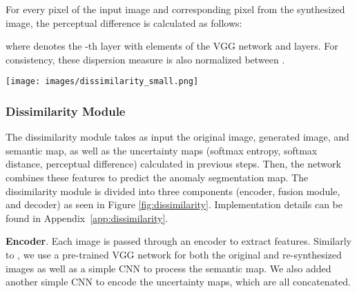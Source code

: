 \documentclass[final]{cvpr}
\begin{document}
For every pixel  of the input image and corresponding pixel  from the synthesized image, the perceptual difference is calculated as follows:



where  denotes the -th layer with  elements of the VGG network and  layers. For consistency, these dispersion measure is also normalized between . 

\begin{figure*}[!th]
\begin{center}
   \texttt{[image: images/dissimilarity\_small.png]}
   \vspace{-9mm}
\end{center}
   \caption{\textbf{Dissimilarity Module Architecture}. Given the input, synthesized, semantic, and uncertainty images, we extract high to low-level features for each image with a CNN. For each level, we then concatenate the input (blue), synthesized (yellow), and semantic (red) features and fuse them with a 1x1 convolution. The resulting map is used to calculate a correlation with the features from the uncertainty maps (green). The output of the fusion module (purple) is then fed to a decoder to produce the predicted anomaly segmentation. Note the semantic map is used in the decoder block to ensure a spatial aware prediction by using a SPADE normalization \cite{SPADE}.}
\label{fig:dissimilarity}
\vspace{-5mm}
\end{figure*}

\subsubsection{Dissimilarity Module}
The dissimilarity module takes as input the original image, generated image, and semantic map, as well as the uncertainty maps (softmax entropy, softmax distance, perceptual difference) calculated in previous steps. Then, the network combines these features to predict the anomaly segmentation map. The dissimilarity module is divided into three components (encoder, fusion module, and decoder) as seen in Figure \ref{fig:dissimilarity}. Implementation details can be found in Appendix~\ref{app:dissimilarity}.

\textbf{Encoder}. Each image is passed through an encoder to extract features. Similarly to \cite{epfl}, we use a pre-trained VGG \cite{vgg} network for both the original and re-synthesized images as well as a simple CNN to process the semantic map. We also added another simple CNN to encode the uncertainty maps, which are all concatenated. 
\end{document}
